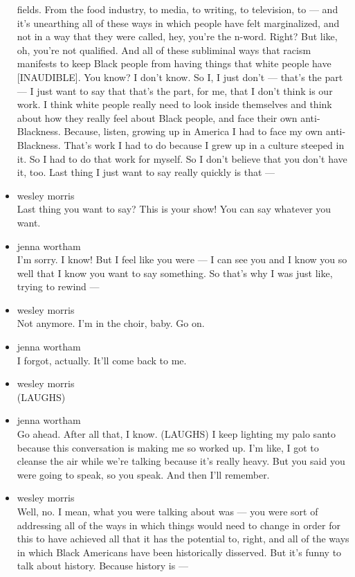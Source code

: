 \begin{itemize}
  fields. From the food industry, to media, to writing, to television,
  to --- and it's unearthing all of these ways in which people have felt
  marginalized, and not in a way that they were called, hey, you're the
  n-word. Right? But like, oh, you're not qualified. And all of these
  subliminal ways that racism manifests to keep Black people from having
  things that white people have {[}INAUDIBLE{]}. You know? I don't know.
  So I, I just don't --- that's the part --- I just want to say that
  that's the part, for me, that I don't think is our work. I think white
  people really need to look inside themselves and think about how they
  really feel about Black people, and face their own anti-Blackness.
  Because, listen, growing up in America I had to face my own
  anti-Blackness. That's work I had to do because I grew up in a culture
  steeped in it. So I had to do that work for myself. So I don't believe
  that you don't have it, too. Last thing I just want to say really
  quickly is that ---
\item
  wesley morris\\
  Last thing you want to say? This is your show! You can say whatever
  you want.
\item
  jenna wortham\\
  I'm sorry. I know! But I feel like you were --- I can see you and I
  know you so well that I know you want to say something. So that's why
  I was just like, trying to rewind ---
\item
  wesley morris\\
  Not anymore. I'm in the choir, baby. Go on.
\item
  jenna wortham\\
  I forgot, actually. It'll come back to me.
\item
  wesley morris\\
  (LAUGHS)
\item
  jenna wortham\\
  Go ahead. After all that, I know. (LAUGHS) I keep lighting my palo
  santo because this conversation is making me so worked up. I'm like, I
  got to cleanse the air while we're talking because it's really heavy.
  But you said you were going to speak, so you speak. And then I'll
  remember.
\item
  wesley morris\\
  Well, no. I mean, what you were talking about was --- you were sort of
  addressing all of the ways in which things would need to change in
  order for this to have achieved all that it has the potential to,
  right, and all of the ways in which Black Americans have been
  historically disserved. But it's funny to talk about history. Because
  history is ---


\end{itemize}
